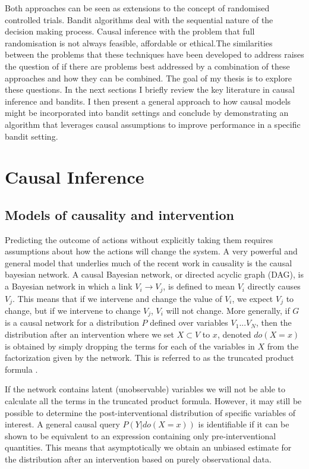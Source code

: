 \documentclass[11pt,a4paper]{article}
\begin{document}
Both approaches can be seen as extensions to the concept of randomised controlled trials. Bandit algorithms deal with the sequential nature of the decision making process. Causal inference with the problem that full randomisation is not always feasible, affordable or ethical.The similarities between the problems that these techniques have been developed to address raises the question of if there are problems best addressed by a combination of these approaches and how they can be combined. The goal of my thesis is to explore these questions. In the next sections I briefly review the key literature in causal inference and bandits. I then present a general approach to  how causal models might be incorporated into bandit settings and conclude by demonstrating an algorithm that leverages causal assumptions to improve performance in a specific bandit setting. 

\section{Causal Inference}

\subsection{Models of causality and intervention}

Predicting the outcome of actions without explicitly taking them requires assumptions about how the actions will change the system. A very powerful and general model that underlies much of the recent work in causality is the causal bayesian network. A causal Bayesian network, or directed acyclic graph (DAG), is a Bayesian network in which a link $V_{i} \rightarrow V_{j}$, is defined to mean $V_{i}$ directly causes $V_{j}$. This means that if we intervene and change the value of $V_{i}$, we expect $V_{j}$ to change, but if we intervene to change $V_{j}$, $V_{i}$ will not change. More generally, if $G$ is a causal network for a distribution $P$ defined over variables $V_{1}...V_{N}$, then the distribution after an intervention where we set $X \subset V$ to $x$, denoted $do(X=x)$ is obtained by simply dropping the terms for each of the variables in $X$ from the factorization given by the network. This is referred to as the truncated product formula \cite{Pearl2000}. 

If the network contains latent (unobservable) variables we will not be able to calculate all the terms in the truncated product formula. However, it may still be possible to determine the post-interventional distribution of specific variables of interest. A general causal query $P(Y|do(X=x))$ is identifiable if it can be shown to be equivalent to an expression containing only pre-interventional quantities. This means that asymptotically we obtain an unbiased estimate for the distribution after an intervention based on purely observational data. 
\end{document}
